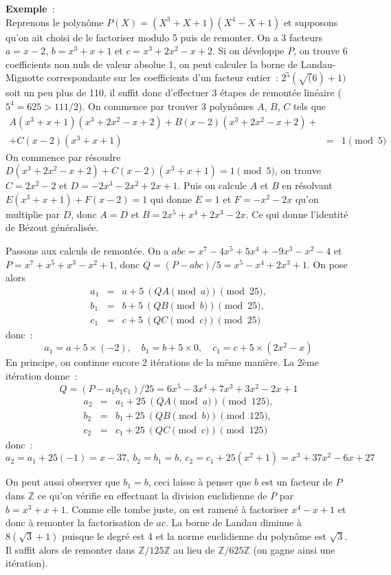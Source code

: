 \documentclass[a4paper,11pt]{article}
\newcommand{\Z}{{\mathbb{Z}}}
\begin{document}
{\bf Exemple}~:\\ 
Reprenons le polynôme $P(X)=(X^3+X+1)(X^4-X+1)$
et supposons qu'on ait choisi de le factoriser modulo 5 puis 
de remonter. On a 3 facteurs
$a=x-2$, $b=x^3+x+1$ et $c=x^3+2x^2-x+2$. Si on développe $P$, on trouve 6
coefficients non nuls de valeur absolue 1, 
on peut calculer la borne de Landau-Mignotte correspondante
sur les coefficients d'un facteur entier~: $2^{5} (\sqrt(6)+1)$
soit un peu plus de 110, il suffit donc d'effectuer 3 étapes de
remontée linéaire ($5^4=625>111/2$).
On commence par trouver 3 polynômes $A$, $B$, $C$ tels que
\begin{eqnarray*}
A(x^3+x+1)(x^3+2x^2-x+2)+B(x-2)(x^3+2x^2-x+2)+& & \\
+C(x-2)(x^3+x+1)&=&1 \pmod 5
\end{eqnarray*}
On commence par résoudre $D(x^3+2x^2-x+2)+C(x-2)(x^3+x+1)=1\pmod 5$,
on trouve $C=2x^2-2$ et $D=-2x^3-2x^2+2x+1$. Puis on calcule
$A$ et $B$ en résolvant $E(x^3+x+1)+F(x-2)=1$ qui donne $E=1$ et 
$F=-x^2-2x$ qu'on multiplie par $D$, donc $A=D$ et $B=2x^5+x^4+2x^3-2x$.
Ce qui donne l'identité de Bézout généralisée.

Passons aux calculs de remontée. On a $abc=x^7-4x^5+5x^4+-9x^3-x^2-4$
et $P=x^7+x^5+x^3-x^2+1$, donc $Q=(P-abc)/5=x^5-x^4+2x^3+1$. On pose
alors 
\begin{eqnarray*} 
a_1&=&a+5 \ (QA \pmod a)\pmod{25}, \\
b_1&=&b+5 \ (QB \pmod b) \pmod{25}, \\
c_1&=&c+5 \ (QC \pmod c) \pmod{25} 
\end{eqnarray*}
donc~:
\[ a_1= a+5 \times (-2), \quad b_1=b+5 \times 0, 
\quad c_1=c+5 \times (2x^2-x) \]
En principe, on continue encore 2 itérations de la même manière.
La 2ème itération donne~: 
\[ Q=(P-a_1 b_1 c_1)/25= 6x^5-3x^4+7x^3+3x^2-2x+1\] 
\begin{eqnarray*} 
a_2&=&a_1+25 \ (QA \pmod a) \pmod{125}, \\
b_2&=&b_1+25 \ (QB \pmod b) \pmod{125},\\
c_2&=&c_1+25 \ (QC \pmod c) \pmod{125}
\end{eqnarray*}
donc~:
\[ a_2=a_1 +25(-1)=x-37, \ b_2=b_1=b, \ c_2=c_1+25(x^2+1) 
=x^3+37x^2-6x+27 \]

On peut aussi observer que $b_1=b$, ceci laisse à penser que $b$ est 
un facteur de $P$ dans $\Z$ ce qu'on vérifie en effectuant la
division euclidienne de $P$ par $b=x^3+x+1$. Comme elle tombe
juste, on est ramené à factoriser $x^4-x+1$ et donc à remonter
la factorisation de $ac$. La borne de Landau diminue à $8(\sqrt{3}+1)$
puisque le degré est 4 et la norme euclidienne du polynôme est $\sqrt{3}$.
Il suffit alors de remonter dans $\Z/125 \Z$ au lieu de $\Z/625 \Z$
(on gagne ainsi une itération).
\end{document}
